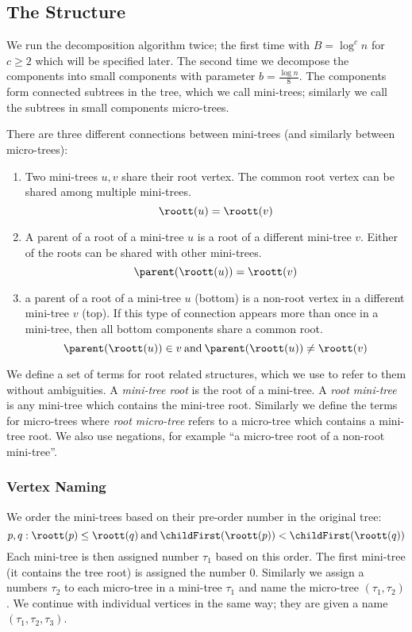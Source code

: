 \subsection{The Structure}

We run the decomposition algorithm twice; the first time with $B = \log^c n$ for $c \ge 2$ which will be specified later.
The second time we decompose the components into small components with parameter $b = \frac{\log n}{8}$.
The components form connected subtrees in the tree, which we call mini-trees; similarly we call the subtrees in small components micro-trees.

There are three different connections between mini-trees (and similarly between micro-trees):
\begin{enumerate}
	\item Two mini-trees $u, v$ share their root vertex.
	The common root vertex can be shared among multiple mini-trees.
	$$\roott(u) = \roott(v)$$

	\item A parent of a root of a mini-tree $u$ is a root of a different mini-tree $v$.
	Either of the roots can be shared with other mini-trees.
	$$\parent(\roott(u)) = \roott(v)$$

	\item a parent of a root of a mini-tree $u$ (bottom) is a non-root vertex in a different mini-tree $v$ (top).
	If this type of connection appears more than once in a mini-tree, then all bottom components share a common root.
	$$\parent(\roott(u)) \in v \booland \parent(\roott(u)) \ne \roott(v)$$
\end{enumerate}

We define a set of terms for root related structures, which we use to refer to them without ambiguities.
A \emph{mini-tree root} is the root of a mini-tree.
A \emph{root mini-tree} is any mini-tree which contains the mini-tree root.
Similarly we define the terms for micro-trees where \emph{root micro-tree} refers to a micro-tree which contains a mini-tree root.
We also use negations, for example ``a micro-tree root of a non-root mini-tree''.

\subsubsection{Vertex Naming}

We order the mini-trees based on their pre-order number in the original tree:
$$ p, q: \roott(p) \le \roott(q) \booland \childFirst(\roott(p)) < \childFirst(\roott(q))$$
Each mini-tree is then assigned number $\tau_1$ based on this order.
The first mini-tree (it contains the tree root) is assigned the number $0$.
Similarly we assign a numbers $\tau_2$ to each micro-tree in a mini-tree $\tau_1$ and name the micro-tree $(\tau_1, \tau_2)$.
We continue with individual vertices in the same way; they are given a name $(\tau_1, \tau_2, \tau_3)$.

